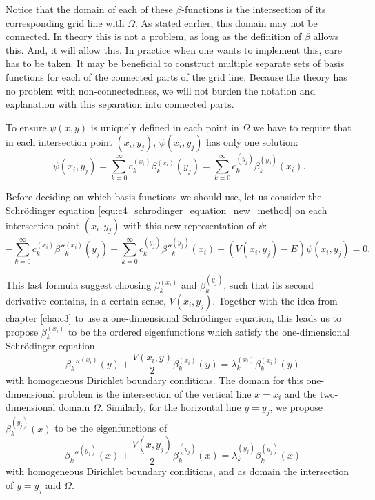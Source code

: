 Notice that the domain of each of these $\beta$-functions is the intersection of its corresponding grid line with $\Omega$. As stated earlier, this domain may not be connected. In theory this is not a problem, as long as the definition of $\beta$ allows this. And, it will allow this. In practice when one wants to implement this, care has to be taken. It may be beneficial to construct multiple separate sets of basis functions for each of the connected parts of the grid line. Because the theory has no problem with non-connectedness, we will not burden the notation and explanation with this separation into connected parts.

To ensure $\psi(x, y)$ is uniquely defined in each point in $\Omega$ we have to require that in each intersection point $(x_i, y_j)$, $\psi(x_i, y_j)$ has only one solution:
\begin{equation}\label{equ:c4_new_method_pre_matrix_equality}
    \psi(x_i, y_j) = \sum_{k=0}^\infty c_k^{(x_i)} \beta_k^{(x_i)}(y_j) = \sum_{k=0}^\infty c_k^{(y_j)} \beta_k^{(y_j)}(x_i)\text{.}
\end{equation}

Before deciding on which basis functions we should use, let us consider the Schrödinger equation \eqref{equ:c4_schrodinger_equation_new_method} on each intersection point $(x_i, y_j)$ with this new representation of $\psi$:
$$
    -\sum_{k=0}^\infty c_k^{(x_i)} \beta''^{(x_i)}_k(y_j) - \sum_{k=0}^\infty c_k^{(y_j)} \beta''^{(y_j)}_k(x_i) + (V(x_i, y_j) - E) \psi(x_i, y_j) = 0\text{.}
$$

This last formula suggest choosing $\beta_k^{(x_i)}$ and $\beta_k^{(y_j)}$, such that its second derivative contains, in a certain sense, $V(x_i, y_j)$. Together with the idea from chapter \ref{cha:c3} to use a one-dimensional Schrödinger equation, this leads us to propose $\beta_k^{(x_i)}$ to be the ordered eigenfunctions which satisfy the one-dimensional Schrödinger equation
$$
    -\beta_k''^{(x_i)}(y) + \frac{V(x_i, y)}{2}\beta_k^{(x_i)}(y) = \lambda_k^{(x_i)} \beta_k^{(x_i)}(y)
$$
with homogeneous Dirichlet boundary conditions. The domain for this one-dimensional problem is the intersection of the vertical line $x = x_i$ and the two-dimensional domain $\Omega$. Similarly, for the horizontal line $y = y_j$, we propose $\beta_k^{(y_j)}(x)$ to be the eigenfunctions of
$$
    -\beta_k''^{(y_j)}(x) + \frac{V(x, y_j)}{2}\beta_k^{(y_j)}(x) = \lambda_k^{(y_j)} \beta_k^{(y_j)}(x)
$$
with homogeneous Dirichlet boundary conditions, and as domain the intersection of $y = y_j$ and $\Omega$.

